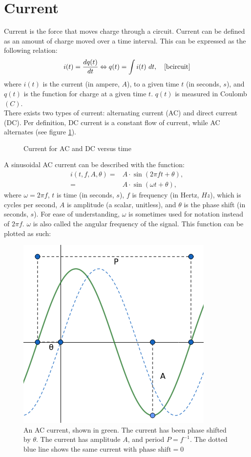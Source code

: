 \section{Current}
Current is the force that moves charge through a circuit. Current can be defined as an amount of charge moved over a time interval. This can be expressed as the following relation:
\begin{align}
i(t)=\dfrac{dq(t)}{dt} \Leftrightarrow q(t)=\int i(t)\ dt,~~~\text{\cite[page~3]{bcircuit}}\label{I=dq/dt}
\end{align}
where $i(t)$ is the current (in ampere, $A$), to a given time $t$ (in seconds, $s$), and $q(t)$ is the function for charge at a given time $t$. $q(t)$ is measured in Coulomb $(C)$.
\\
There exists two types of current: alternating current (AC) and direct current (DC). Per definition, DC current is a constant flow of current, while AC alternates (see figure \ref{fig:ACDC}). 
\begin{figure}[H] 

\caption{Current for AC and DC versus time}
\label{fig:ACDC}
\end{figure}
\noindent
A sinusoidal AC current can be described with the function: 
\begin{align}
i\left(t, f, A, \theta\right) =& A\cdot \sin{\left(2\pi ft + \theta\right)}, \nonumber
\\
=& A \cdot \sin{\left(\omega t + \theta\right)}, \label{eq:omega}
\end{align}
where $\omega = 2\pi f$, $t$ is time (in seconds, $s$), $f$ is frequency (in Hertz, $Hz$), which is cycles per second, $A$ is amplitude (a scalar, unitless), and $\theta$ is the phase shift (in seconds, $s$).
For ease of understanding, $\omega$ is sometimes used for notation instead of $2\pi f$. $\omega$ is also called the angular frequency of the signal.
This function can be plotted as such:
\begin{figure}[H]
	\centering
	\includegraphics[scale=0.7]{fig/img/AC.png}
	\caption{An AC current, shown in green. The current has been phase shifted by $\theta$. The current has amplitude $A$, and period $P=f^{-1}$. The dotted blue line shows the same current with $\text{phase shift} =0$}
\end{figure}

